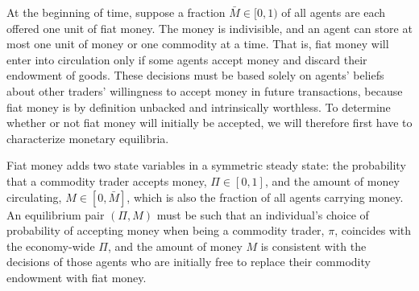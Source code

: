 At the beginning of time, suppose a fraction $\bar M \in [0,1)$ of all
agents are each offered one unit of fiat money. The money is
indivisible, and an agent can store at most one unit of money or one
commodity at a time. That is, fiat money will enter into circulation only
if some agents accept money and discard their endowment of goods. These
decisions must be based solely on agents' beliefs about other traders'
willingness to accept money in future transactions, because fiat money
is by definition unbacked and intrinsically worthless. To determine
whether or not fiat money will initially be accepted, we will therefore
first have to characterize monetary equilibria.

Fiat money adds two state variables in a symmetric steady state:
the probability that a commodity trader accepts money, $\Pi\in[0,1]$,
and the amount of money circulating, $M\in[0, \bar M]$, which is
also the fraction of all agents carrying money. An equilibrium pair
$(\Pi, M)$ must be such that an individual's choice of probability of
accepting money when being a commodity trader, $\pi$, coincides
with the economy-wide $\Pi$, and the amount of money $M$ is consistent
with the decisions of those agents who are initially free to replace
their commodity endowment with fiat money.

